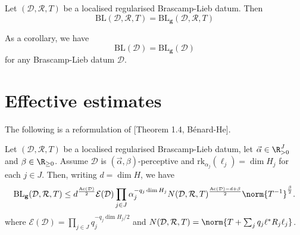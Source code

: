 \begin{theorem} \label{general-Liebthm}
Let $(\mathcal{D},\mathcal{R}, T)$ be a localised regularised Brascamp-Lieb datum.
Then
\begin{equation}\label{gaussian-upp}
\mathrm{BL}(\mathcal{D}, \mathcal{R}, T) = \mathrm{BL}_{\mathbf{g}}(\mathcal{D}, \mathcal{R}, T)
\end{equation}
\end{theorem}
As a corollary, we have
\[
\mathrm{BL}(\mathcal{D}) = \mathrm{BL}_{\mathbf{g}}(\mathcal{D})
\]
for any Brascamp-Lieb datum $\mathcal{D}$.

\section{Effective estimates}


The following is a reformulation of [Theorem 1.4, Bénard-He].
\begin{theorem}
\label{thm:BL_local_regular_upper_bound}
Let $(\mathcal{D},\mathcal{R}, T)$ be a  localised regularised Brascamp-Lieb datum, let  $\vec{\alpha} \in \R_{>0}^J$ and $\beta \in \R_{\geq 0}$. Assume $\mathcal{D}$ is $(\vec{\alpha}, \beta)$-perceptive and  $\mathrm{rk}_{\alpha_j}(\ell_j) = \dim H_j$ for each $j \in J$.
Then, writing $d = \dim H$, we have
\begin{equation}\label{eq:rlub}
\mathrm{BL}_{\mathbf{g}}(\mathcal{D}, \mathcal{R}, T)
\leq d^{\frac{\mathrm{Ac}(\mathcal{D})}{2}}  \mathcal{E}(\mathcal{D}) \prod_{j \in J} \alpha_j^{-q_j \dim H_j} N(\mathcal{D}, \mathcal{R}, T)^{\frac{\mathrm{Ac}(\mathcal{D})-d+\beta}{2}} \norm{T^{-1}}^{\frac{\beta}{2}}.
\end{equation}
where $\mathcal{E}(\mathcal{D}) = \prod_{j \in J} q_j^{-q_j  \dim H_j / 2}$ and $N(\mathcal{D}, \mathcal{R}, T) =  \norm{T + \sum_{j} q_j \ell^* R_j \ell_j}$.
\end{theorem}

